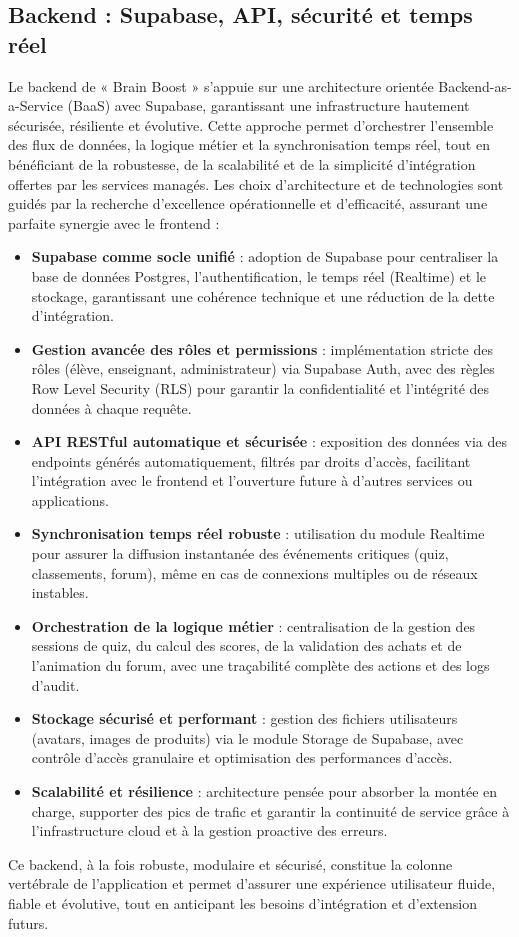 \documentclass[a4paper,11pt]{report}
\begin{document}
\subsection{Backend : Supabase, API, sécurité et temps réel}
Le backend de « Brain Boost » s'appuie sur une architecture orientée Backend-as-a-Service (BaaS) avec Supabase, garantissant une infrastructure hautement sécurisée, résiliente et évolutive. Cette approche permet d'orchestrer l'ensemble des flux de données, la logique métier et la synchronisation temps réel, tout en bénéficiant de la robustesse, de la scalabilité et de la simplicité d'intégration offertes par les services managés. Les choix d'architecture et de technologies sont guidés par la recherche d'excellence opérationnelle et d'efficacité, assurant une parfaite synergie avec le frontend :
\begin{itemize}
    \item \textbf{Supabase comme socle unifié} : adoption de Supabase pour centraliser la base de données Postgres, l'authentification, le temps réel (Realtime) et le stockage, garantissant une cohérence technique et une réduction de la dette d'intégration.
    \item \textbf{Gestion avancée des rôles et permissions} : implémentation stricte des rôles (élève, enseignant, administrateur) via Supabase Auth, avec des règles Row Level Security (RLS) pour garantir la confidentialité et l'intégrité des données à chaque requête.
    \item \textbf{API RESTful automatique et sécurisée} : exposition des données via des endpoints générés automatiquement, filtrés par droits d'accès, facilitant l'intégration avec le frontend et l'ouverture future à d'autres services ou applications.
    \item \textbf{Synchronisation temps réel robuste} : utilisation du module Realtime pour assurer la diffusion instantanée des événements critiques (quiz, classements, forum), même en cas de connexions multiples ou de réseaux instables.
    \item \textbf{Orchestration de la logique métier} : centralisation de la gestion des sessions de quiz, du calcul des scores, de la validation des achats et de l'animation du forum, avec une traçabilité complète des actions et des logs d'audit.
    \item \textbf{Stockage sécurisé et performant} : gestion des fichiers utilisateurs (avatars, images de produits) via le module Storage de Supabase, avec contrôle d'accès granulaire et optimisation des performances d'accès.
    \item \textbf{Scalabilité et résilience} : architecture pensée pour absorber la montée en charge, supporter des pics de trafic et garantir la continuité de service grâce à l'infrastructure cloud et à la gestion proactive des erreurs.
\end{itemize}
Ce backend, à la fois robuste, modulaire et sécurisé, constitue la colonne vertébrale de l'application et permet d'assurer une expérience utilisateur fluide, fiable et évolutive, tout en anticipant les besoins d'intégration et d'extension futurs.
\end{document}

